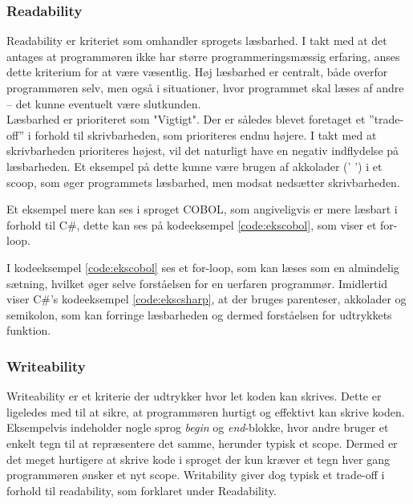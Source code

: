\subsubsection{Readability} 
Readability er kriteriet som omhandler sprogets læsbarhed. I takt med at det antages at programmøren ikke har større programmeringsmæssig erfaring, anses dette kriterium for at være væsentlig. Høj læsbarhed er centralt, både overfor programmøren selv, men også i situationer, hvor programmet skal læses af andre – det kunne eventuelt være slutkunden. \\

\noindent Læsbarhed er prioriteret som "Vigtigt". Der er således blevet foretaget et ”trade-off” i forhold til skrivbarheden, som prioriteres endnu højere. I takt med at skrivbarheden prioriteres højest, vil det naturligt have en negativ indflydelse på læsbarheden. Et eksempel på dette kunne være brugen af akkolader (’{ }’) i et scoop, som øger programmets læsbarhed, men modsat nedsætter skrivbarheden. 

Et eksempel mere kan ses i sproget COBOL, som angiveligvis er mere læsbart i forhold til C\#, dette kan ses på kodeeksempel \ref{code:ekscobol}, som viser et for-loop.


\noindent I kodeeksempel \ref{code:ekscobol} ses et for-loop, som kan læses som en almindelig sætning, hvilket øger selve forståelsen for en uerfaren programmør. Imidlertid viser C\#’s kodeeksempel \ref{code:ekscsharp}, at der bruges parenteser, akkolader og semikolon, som kan forringe læsbarheden og dermed forståelsen for udtrykkets funktion. 


\subsubsection{Writeability} 
Writeability er et kriterie der udtrykker hvor let koden kan skrives. Dette er ligeledes med til at sikre, at programmøren hurtigt og effektivt kan skrive koden. Eksempelvis indeholder nogle sprog \textit{begin} og \textit{end}-blokke, hvor andre bruger et enkelt tegn til at repræsentere det samme, herunder typisk et scope. Dermed er det meget hurtigere at skrive kode i sproget der kun kræver et tegn hver gang programmøren ønsker et nyt scope.
Writability giver dog typisk et trade-off i forhold til readability, som forklaret under Readability.

